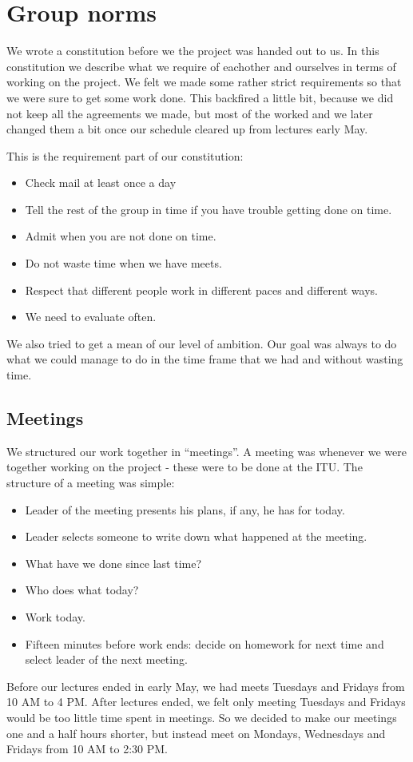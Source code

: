 \chapter{Group norms}
\label{GN}
We wrote a constitution before we the project was handed out to us. In this
constitution we describe what we require of eachother and ourselves in terms of
working on the project. We felt we made some rather strict requirements so that
we were sure to get some work done. This backfired a little bit, because we did
not keep all the agreements we made, but most of the worked and we later changed
them a bit once our schedule cleared up from lectures early May.

This is the requirement part of our constitution:
\begin{itemize}
  \item Check mail at least once a day
  \item Tell the rest of the group in time if you have trouble getting done on
  time.
  \item Admit when you are not done on time.
  \item Do not waste time when we have meets.
  \item Respect that different people work in different paces and different
  ways.
  \item We need to evaluate often.
\end{itemize}

We also tried to get a mean of our level of ambition. Our goal was always to do
what we could manage to do in the time frame that we had and without wasting
time. 
\section{Meetings}
\label{GN-M}
We structured our work together in ``meetings''. A meeting was whenever we were
together working on the project - these were to be done at the ITU. The
structure of a meeting was simple:
\begin{itemize}
  \item Leader of the meeting presents his plans, if any, he has for today. 
  \item Leader selects someone to write down what happened at the meeting.
  \item What have we done since last time?
  \item Who does what today?
  \item Work today.
  \item Fifteen minutes before work ends: decide on homework for next time and
  select leader of the next meeting.
\end{itemize}
Before our lectures ended in early May, we had meets Tuesdays and Fridays from
10 AM to 4 PM. After lectures ended, we felt only meeting Tuesdays and Fridays
would be too little time spent in meetings. So we decided to make our meetings
one and a half hours shorter, but instead meet on Mondays, Wednesdays and
Fridays from 10 AM to 2:30 PM.
